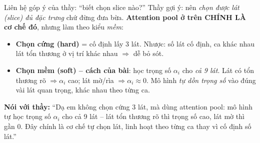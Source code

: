 \documentclass[12pt,a4paper]{article}
\begin{document}
\begin{keybox}{Liên hệ góp ý của thầy: ``biết chọn slice nào?''}
Thầy gợi ý: nên \emph{chọn được lát (slice) đủ đặc trưng} chứ đừng đưa bừa. \textbf{Attention pool ở trên CHÍNH LÀ cơ chế đó}, nhưng làm theo kiểu \emph{mềm}:
\begin{itemize}[leftmargin=1.4em,itemsep=1pt]
\item \textbf{Chọn cứng (hard)} = cố định lấy 3 lát. Nhược: số lát cố định, ca khác nhau lát tổn thương ở vị trí khác nhau $\Rightarrow$ dễ bỏ sót.
\item \textbf{Chọn mềm (soft) -- cách của bài}: học trọng số $\alpha_i$ cho \emph{cả 9 lát}. Lát có tổn thương rõ $\Rightarrow \alpha_i$ cao; lát mờ/rìa $\Rightarrow \alpha_i\approx 0$. Mô hình \emph{tự dồn trọng số} vào đúng vài lát quan trọng, khác nhau theo từng ca.
\end{itemize}
\textbf{Nói với thầy:} ``Dạ em không chọn cứng 3 lát, mà dùng attention pool: mô hình tự học trọng số $\alpha_i$ cho cả 9 lát -- lát tổn thương rõ thì trọng số cao, lát mờ thì gần 0. Đây chính là cơ chế tự chọn lát, linh hoạt theo từng ca thay vì cố định số lát.''
\end{keybox}
\end{document}
